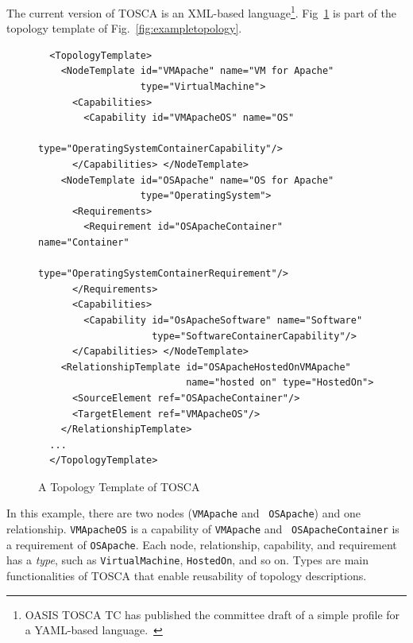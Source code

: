 \documentclass[12pt]{report}
\begin{document}
The current version of TOSCA is an XML-based language\footnote{OASIS
  TOSCA TC has published the committee draft of a simple profile for a
  YAML-based language.~\cite{TOSCAYAML}}. Fig~\ref{fig:topology} is 
part of the topology template of Fig.~\ref{fig:exampletopology}.
\begin{figure}
\small
\begin{verbatim}
  <TopologyTemplate>
    <NodeTemplate id="VMApache" name="VM for Apache" 
                  type="VirtualMachine">
      <Capabilities>
        <Capability id="VMApacheOS" name="OS" 
                    type="OperatingSystemContainerCapability"/>
      </Capabilities> </NodeTemplate>
    <NodeTemplate id="OSApache" name="OS for Apache" 
                  type="OperatingSystem">
      <Requirements>
        <Requirement id="OSApacheContainer" name="Container" 
                     type="OperatingSystemContainerRequirement"/>
      </Requirements>
      <Capabilities>
        <Capability id="OsApacheSoftware" name="Software" 
                    type="SoftwareContainerCapability"/>
      </Capabilities> </NodeTemplate>
    <RelationshipTemplate id="OSApacheHostedOnVMApache"
                          name="hosted on" type="HostedOn">
      <SourceElement ref="OSApacheContainer"/>
      <TargetElement ref="VMApacheOS"/>
    </RelationshipTemplate>
  ...
  </TopologyTemplate>
\end{verbatim}
\normalsize
\caption{A Topology Template of TOSCA}
\label{fig:topology}
\end{figure}
In this example, there are two nodes ({\tt VMApache} and {\tt
  OSApache}) and one relationship.  
{\tt VMApacheOS} is a capability of {\tt VMApache} and {\tt
  OSApacheContainer} is a requirement of {\tt OSApache}.  
Each node, relationship, capability, and requirement
has a {\it type}, such as {\tt VirtualMachine}, {\tt HostedOn}, and so
on. Types are main functionalities of TOSCA that enable reusability of
topology descriptions.
\end{document}
